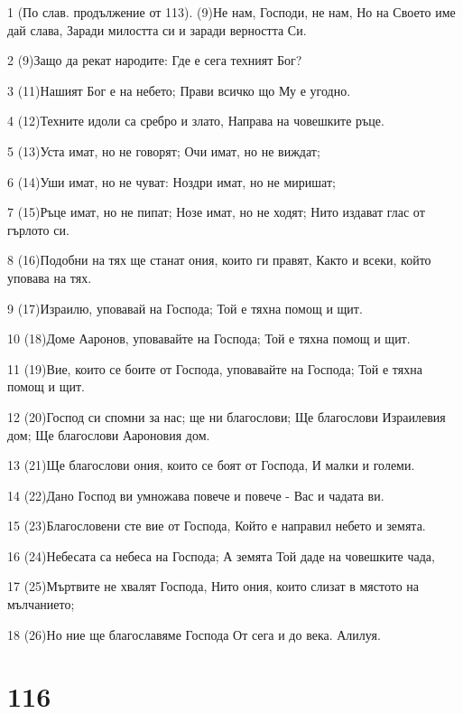 \par 1 (По слав. продължение от 113). (9)Не нам, Господи, не нам, Но на Своето име дай слава, Заради милостта си и заради верността Си.
\par 2 (9)Защо да рекат народите: Где е сега техният Бог?
\par 3 (11)Нашият Бог е на небето; Прави всичко що Му е угодно.
\par 4 (12)Техните идоли са сребро и злато, Направа на човешките ръце.
\par 5 (13)Уста имат, но не говорят; Очи имат, но не виждат;
\par 6 (14)Уши имат, но не чуват: Ноздри имат, но не миришат;
\par 7 (15)Ръце имат, но не пипат; Нозе имат, но не ходят; Нито издават глас от гърлото си.
\par 8 (16)Подобни на тях ще станат ония, които ги правят, Както и всеки, който уповава на тях.
\par 9 (17)Израилю, уповавай на Господа; Той е тяхна помощ и щит.
\par 10 (18)Доме Ааронов, уповавайте на Господа; Той е тяхна помощ и щит.
\par 11 (19)Вие, които се боите от Господа, уповавайте на Господа; Той е тяхна помощ и щит.
\par 12 (20)Господ си спомни за нас; ще ни благослови; Ще благослови Израилевия дом; Ще благослови Аароновия дом.
\par 13 (21)Ще благослови ония, които се боят от Господа, И малки и големи.
\par 14 (22)Дано Господ ви умножава повече и повече - Вас и чадата ви.
\par 15 (23)Благословени сте вие от Господа, Който е направил небето и земята.
\par 16 (24)Небесата са небеса на Господа; А земята Той даде на човешките чада,
\par 17 (25)Мъртвите не хвалят Господа, Нито ония, които слизат в мястото на мълчанието;
\par 18 (26)Но ние ще благославяме Господа От сега и до века. Алилуя.

\chapter{116}

